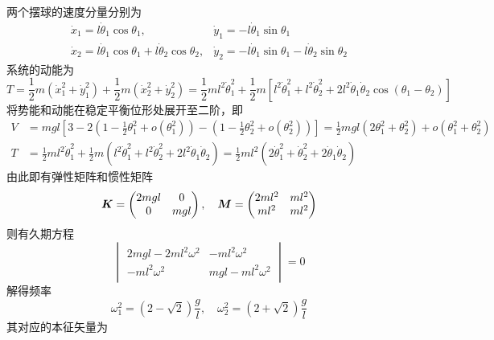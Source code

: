 \begin{example}[双摆]
两个摆球的速度分量分别为
\begin{equation*}
\begin{array}{ll}
	\dot{x}_1 = l \dot{\theta}_1\cos\theta_1,& \dot{y}_1 = -l \dot{\theta}_1\sin\theta_1 \\
	\dot{x}_2 = l \dot{\theta}_1\cos\theta_1+l \dot{\theta}_2\cos\theta_2,& \dot{y}_2 = -l \dot{\theta}_1\sin\theta_1-l \dot{\theta}_2\sin\theta_2
\end{array}
\end{equation*}
系统的动能为
\begin{equation*}
	T = \frac12 m(\dot{x}_1^2+\dot{y}_1^2) + \frac12 m(\dot{x}_2^2+\dot{y}_2^2) = \frac12 ml^2 \dot{\theta}_1^2 + \frac12 m\left[l^2 \dot{\theta}_1^2 + l^2 \dot{\theta}_2^2 + 2l^2 \dot{\theta}_1 \dot{\theta}_2 \cos (\theta_1 - \theta_2)\right]
\end{equation*}
将势能和动能在稳定平衡位形处展开至二阶，即
\begin{align*}
	V & = mgl\left[3-2\left(1-\frac12 \theta_1^2+o(\theta_1^2)\right)-\left(1-\frac12 \theta_2^2+o(\theta_2^2)\right)\right] = \frac12 mgl(2\theta_1^2 + \theta_2^2) + o(\theta_1^2+\theta_2^2) \\
	T & = \frac12 ml^2 \dot{\theta}_1^2 + \frac12 m\left(l^2 \dot{\theta}_1^2 + l^2 \dot{\theta}_2^2 + 2l^2 \dot{\theta}_1 \dot{\theta}_2\right) = \frac12 ml^2 \left(2\dot{\theta}_1^2+\dot{\theta}_2^2+ 2\dot{\theta}_1\dot{\theta}_2\right)
\end{align*}
由此即有弹性矩阵和惯性矩阵
\begin{equation*}
	\boldsymbol{K} = \begin{pmatrix} 2mgl & 0 \\ 0 & mgl \end{pmatrix},\quad \boldsymbol{M} = \begin{pmatrix} 2ml^2 & ml^2 \\ ml^2 & ml^2 \end{pmatrix}
\end{equation*}
则有久期方程
\begin{equation*}
	\begin{vmatrix}
		2mgl-2ml^2 \omega^2 & -ml^2\omega^2 \\
		-ml^2\omega^2 & mgl-ml^2\omega^2
	\end{vmatrix} = 0
\end{equation*}
解得频率
\begin{equation*}
	\omega_1^2 = (2-\sqrt{2})\frac{g}{l},\quad \omega_2^2 = (2+\sqrt{2})\frac{g}{l}
\end{equation*}
其对应的本征矢量为

\end{example}
